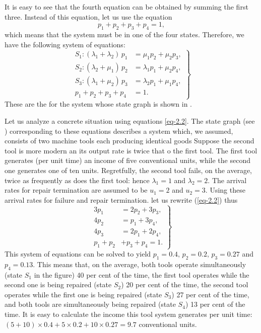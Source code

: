 It is easy to see that the fourth equation can be obtained by summing
the ﬁrst three. Instead of this equation, let us use the equation
\begin{equation*}%
p_{1}+p_{2}+p_{3}+p_{4}= 1,
\end{equation*}
which means that the system must be in one of the four states.
Therefore, we have the following system of equations:
\begin{equation}%
\left.
\begin{split}
S_{1}: (\lambda_{1} + \lambda_{2}) \, p_{1} & = \mu_{1} p_{2} + \mu_{2} p_{3}, \\
S_{2}: (\lambda_{2} + \mu_{1}) \, p_{2} & = \lambda_{1} p_{1} + \mu_{2} p_{4}, \\
S_{3}: (\lambda_{1} + \mu_{2}) \, p_{3} & = \lambda_{2} p_{1} + \mu_{1} p_{4},  \\
p_{1} + p_{2} + p_{3} + p_{4} & = 1.
\end{split}
\right\}
\label{eq-2.2}
\end{equation}
These are the  for the system whose state
graph is shown in .

 Let us analyze a concrete
situation using equations \eqref{eq-2.2}. The state graph (see )
corresponding to these equations describes a system which, we assumed,
consists of two machine tools each producing identical goods Suppose
the second tool is more modern an its output rate is twice that o the
first tool. The ﬁrst tool generates (per unit time) an income of five
conventional units, while the second one generates one of ten units.
Regretfully, the second tool fails, on the average, twice as
frequently as does the ﬁrst tool: hence $\lambda_{1} = 1$ and
$\lambda_{2} =2$. The arrival
rates for repair termination are assumed to be $u_{1} =2$ and $u_{2} =3$. Using
these arrival rates for failure and repair termination. let us rewrite
(\ref{eq-2.2}) thus 
\begin{equation*}
\left.
\begin{split}
3p_{1} & = 2p_{2} + 3p_{3}, \\
4p_{2} & = p_{1} + 3p_{4}, \\
4p_{3} & = 2p_{1} + 2p_{4}, \\
p_{1} +p_{2}&+p_{3}+p_{4}= 1.
\end{split}
\right\}
\end{equation*}
This system of equations can be solved to yield
$p_{1}= 0.4, \, p_{2}=0.2, \, p_{3} = 0.27$ and $p_{4} = 0.13$. This
means that, on the average, both tools operate simultaneously (state
$S_{1}$ in the ﬁgure) 40 per cent of the time, the ﬁrst tool operates
while the second one is being repaired (state $S_{2}$) 20 per cent of
the time, the second tool operates while the ﬁrst one is being
repaired (state $S_{3}$) 27 per cent of the time, and both tools are
simultaneously being repaired (state $S_{4}$) 13 per cent of the
time. It is easy to calculate the income this tool system generates
per unit time: $(5+10) \times 0.4+5 \times 0.2+10 \times 0.27 =9.7$
conventional units.

